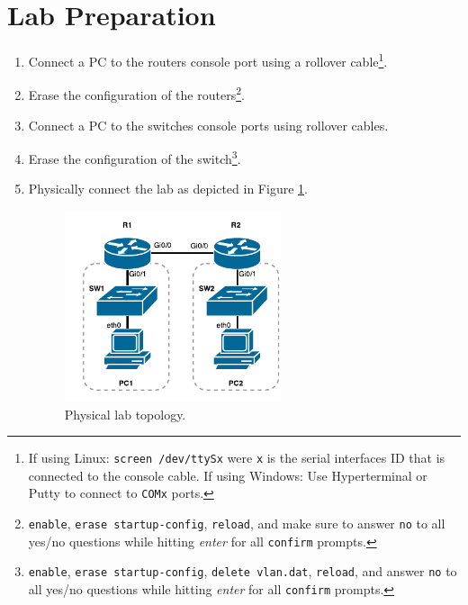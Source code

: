 \documentclass[pdftex,12pt,a4paper]{article}
\begin{document}
    \section{Lab Preparation}
        \begin{enumerate}
            \item Connect a PC to the routers console port using a rollover
                cable\footnote{If using Linux: \texttt{screen /dev/ttySx} were
                \texttt{x} is the
                serial interfaces ID that is connected to the console
                cable. If using Windows: Use Hyperterminal or Putty to
                connect to \texttt{COMx} ports.}.
            \item Erase the configuration of the
                routers\footnote{\texttt{enable}, \texttt{erase
                startup-config}, \texttt{reload}, and make sure to answer
                \texttt{no} to all yes/no questions while hitting
                \emph{enter} for all \texttt{confirm} prompts.}.
            \item Connect a PC to the switches console ports using rollover
                cables.
            \item Erase the configuration of the
                switch\footnote{\texttt{enable}, \texttt{erase startup-config},
                \texttt{delete vlan.dat}, \texttt{reload}, and answer
                \texttt{no} to all yes/no questions while hitting
                \emph{enter} for all \texttt{confirm} prompts.}.
            \item Physically connect the lab as depicted in Figure \ref{fig:labtop}.

                \begin{figure}[tbh]
                    \centering
                    \includegraphics[width=0.6\textwidth]{figures/labtop}
                    \caption{Physical lab topology.}
                    \label{fig:labtop}
                \end{figure}


\end{enumerate}
\end{document}
